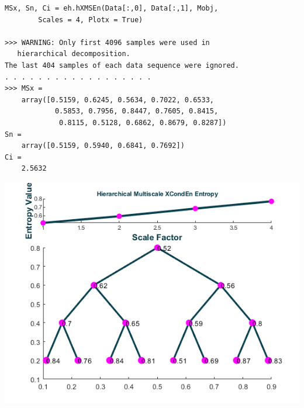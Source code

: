 \documentclass[12pt, a4paper, titlepage, openany]{book}
\begin{document}
\begin{verbatim}
MSx, Sn, Ci = eh.hXMSEn(Data[:,0], Data[:,1], Mobj, 
		Scales = 4, Plotx = True)
   
>>> WARNING: Only first 4096 samples were used in 
   hierarchical decomposition.
The last 404 samples of each data sequence were ignored. 
. . . . . . . . . . . . . . . . . .
>>> MSx = 
    array([0.5159, 0.6245, 0.5634, 0.7022, 0.6533,
    	 	0.5853, 0.7956, 0.8447, 0.7605, 0.8415, 
    	 	 0.8115, 0.5128, 0.6862, 0.8679, 0.8287])
Sn =
    array([0.5159, 0.5940, 0.6841, 0.7692])
Ci = 
	2.5632
\end{verbatim}
\includegraphics[scale=.75]{xhier.png}\newline \newline


\newpage
\end{document}
